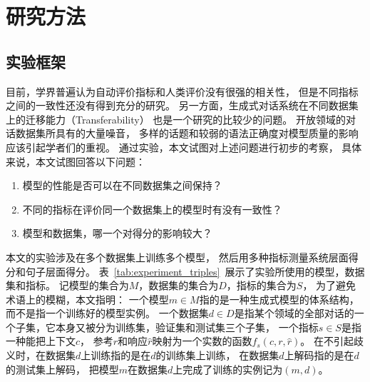 % 
% 
% 
% 

\chapter{研究方法}\label{ch:method}

\section{实验框架}\label{sec:eval_framework}
目前，学界普遍认为自动评价指标和人类评价没有很强的相关性，
但是不同指标之间的一致性还没有得到充分的研究。
另一方面，生成式对话系统在不同数据集上的迁移能力（Transferability）
也是一个研究的比较少的问题。
开放领域的对话数据集所具有的大量噪音，
多样的话题和较弱的语法正确度对模型质量的影响应该引起学者们的重视。
通过实验，本文试图对上述问题进行初步的考察，
具体来说，本文试图回答以下问题：
\begin{enumerate}
    \item 模型的性能是否可以在不同数据集之间保持？
    \item 不同的指标在评价同一个数据集上的模型时有没有一致性？
    \item 模型和数据集，哪一个对得分的影响较大？
\end{enumerate}

本文的实验涉及在多个数据集上训练多个模型，
然后用多种指标测量系统层面得分和句子层面得分。
表~\ref{tab:experiment_triples}~展示了实验所使用的模型，数据集和指标。
记模型的集合为$M$，数据集的集合为$D$，指标的集合为$S$，
为了避免术语上的模糊，本文指明：
一个模型$m \in M$指的是一种生成式模型的体系结构，而不是指一个训练好的模型实例。
一个数据集$d \in D$是指某个领域的全部对话的一个子集，它本身又被分为训练集，验证集和测试集三个子集，
一个指标$s \in S$是指一种能把上下文$c$，
参考$r$和响应$\hat{r}$映射为一个实数的函数$f_s(c, r, \hat{r})$。
在不引起歧义时，在数据集$d$上训练指的是在$d$的训练集上训练，
在数据集$d$上解码指的是在$d$的测试集上解码，
把模型$m$在数据集$d$上完成了训练的实例记为$(m, d)$。

